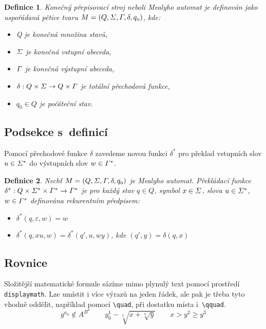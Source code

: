 \documentclass[a4paper, twocolumn, 11pt]{article}
\newtheorem{definition}{Definice}
\begin{document}
\begin{definition}
    \label{definice1}\emph{Konečný přepisovací stroj} neboli \emph{Mealyho automat} je definován jako uspořádaná pětice tvaru $\mathnormal{M=(Q,\Sigma,\Gamma,\delta,q_0)}$, kde:

    \begin{itemize}
        \item Q je konečná množina \emph{stavů,}
        \item $\mathnormal{\Sigma}$ je konečná vstupní \emph{abeceda,}
        \item $\mathnormal{\Gamma}$ je konečná výstupní \emph{abeceda,}
        \item $\mathnormal{\delta:Q\times\Sigma\rightarrow Q\times\Gamma}$ je totální \emph{přechodová funkce,}
        \item $q_0\in Q$ je \emph{počáteční stav.}
    \end{itemize}
\end{definition}

\subsection{Podsekce s~definicí}

Pomocí přechodové funkce $\delta$ zavedeme novou funkci $\delta^*$ pro překlad vstupních slov $\mathnormal{u\in\Sigma^*}$ do výstupních slov $\mathnormal{w\in\Gamma^*}$.

\begin{definition}
    Nechť $\mathnormal{M=(Q,\Sigma,\Gamma,\delta,q_0)}$ je Mealyho automat. \emph{Překládací funkce} $\mathnormal{\delta^*:Q\times\Sigma^*\times\Gamma^*\rightarrow\Gamma^*}$ je pro každý stav $q\in Q$, symbol $\mathnormal{x\in\Sigma}$, slova $\mathnormal{u\in\Sigma^*}$, $\mathnormal{w\in\Gamma^*}$ definována rekurentním předpisem:
    \begin{itemize}
        \item $\delta^*(q,\varepsilon,w)=w$
        \item $\delta^*(q,xu,w)=\delta^*(q',u,wy)$, kde $(q',y)=\delta(q,x)$
    \end{itemize}
\end{definition}

\subsection{Rovnice}

Složitější matematické formule sázíme mimo plynulý text pomocí prostředí \texttt{displaymath}. Lze umístit i více výrazů na jeden řádek, ale pak je třeba tyto vhodně oddělit, například pomocí \verb|\quad|, při dostatku místa i~\verb|\qquad|.
$$g^{a_n}\notin A^{B^n}\qquad y^1_0-\sqrt[5]{x+\sqrt[7]{y}}\qquad x>y^2\geq y^3$$
\end{document}
